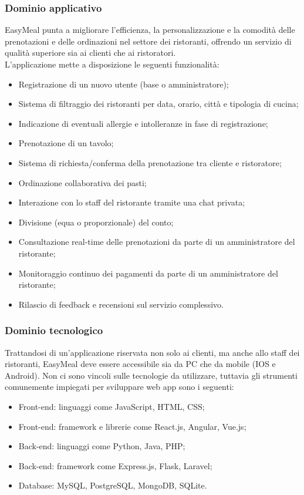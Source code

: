 \subsubsection{Dominio applicativo}
EasyMeal punta a migliorare l’efficienza, la personalizzazione e la comodità delle prenotazioni e delle ordinazioni nel settore dei ristoranti, offrendo un servizio di qualità superiore sia ai clienti che ai ristoratori.
\\ 
L’applicazione mette a disposizione le seguenti funzionalità:
\begin{itemize}
  \item Registrazione di un nuovo utente (base o amministratore);
  \item Sistema di filtraggio dei ristoranti per data, orario, città e tipologia di cucina;
  \item Indicazione di eventuali allergie e intolleranze in fase di registrazione;
  \item Prenotazione di un tavolo;
  \item Sistema di richiesta/conferma della prenotazione tra cliente e ristoratore;
  \item Ordinazione collaborativa dei pasti;
  \item Interazione con lo staff del ristorante tramite una chat privata;
  \item Divisione (equa o proporzionale) del conto;
  \item Consultazione real-time delle prenotazioni da parte di un amministratore del ristorante;
  \item Monitoraggio continuo dei pagamenti da parte di un amministratore del ristorante;
  \item Rilascio di feedback e recensioni sul servizio complessivo.
\end{itemize}

\subsubsection{Dominio tecnologico}
Trattandosi di un’applicazione riservata non solo ai clienti, ma anche allo staff dei ristoranti, EasyMeal deve essere accessibile sia da PC che da mobile (IOS e Android). Non ci sono vincoli sulle tecnologie da utilizzare, tuttavia gli strumenti comunemente impiegati per sviluppare web app sono i seguenti:
\begin{itemize}
  \item Front-end: linguaggi come JavaScript, HTML, CSS;
  \item Front-end: framework e librerie come React.js, Angular, Vue.js;
  \item Back-end: linguaggi come Python, Java, PHP;
  \item Back-end: framework come Express.js, Flask, Laravel;
  \item Database: MySQL, PostgreSQL, MongoDB, SQLite.
\end{itemize}


